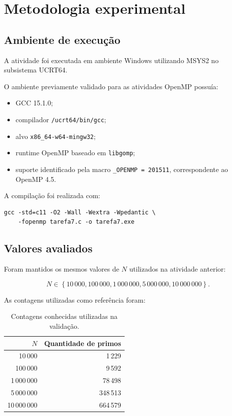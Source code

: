 \section{Metodologia experimental}
\label{sec:atvd07-metodologia}

\subsection{Ambiente de execução}

A atividade foi executada em ambiente Windows utilizando MSYS2 no
subsistema UCRT64.

O ambiente previamente validado para as atividades OpenMP possuía:

\begin{itemize}
    \item GCC 15.1.0;
    \item compilador \texttt{/ucrt64/bin/gcc};
    \item alvo \texttt{x86\_64-w64-mingw32};
    \item runtime OpenMP baseado em \texttt{libgomp};
    \item suporte identificado pela macro
    \texttt{\_OPENMP = 201511}, correspondente ao OpenMP 4.5.
\end{itemize}

A compilação foi realizada com:

\begin{verbatim}
gcc -std=c11 -O2 -Wall -Wextra -Wpedantic \
    -fopenmp tarefa7.c -o tarefa7.exe
\end{verbatim}


\subsection{Valores avaliados}

Foram mantidos os mesmos valores de \(N\) utilizados na atividade anterior:

\[
N \in
\left\{
10\,000,
100\,000,
1\,000\,000,
5\,000\,000,
10\,000\,000
\right\}.
\]

As contagens utilizadas como referência foram:

\begin{table}[htbp]
\centering
\caption{Contagens conhecidas utilizadas na validação.}
\label{tab:atvd07-primos-referencia}
\begin{tabular}{|r|r|}
\hline
\textbf{\(N\)} & \textbf{Quantidade de primos} \\
\hline
10\,000 & 1\,229 \\
100\,000 & 9\,592 \\
1\,000\,000 & 78\,498 \\
5\,000\,000 & 348\,513 \\
10\,000\,000 & 664\,579 \\
\hline
\end{tabular}
\end{table}


